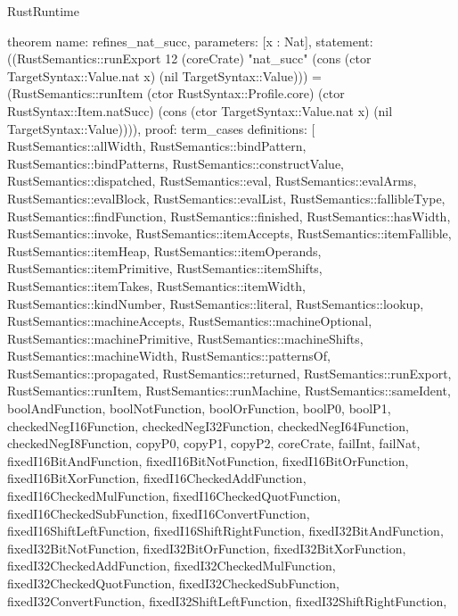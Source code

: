 \begin{lexlean}{RustRuntime}
\begin{semanticmodule}
theorem{
  name: refines_nat_succ,
  parameters: [x : Nat],
  statement: ((RustSemantics::runExport 12 (coreCrate) "nat_succ" (cons (ctor TargetSyntax::Value.nat x) (nil TargetSyntax::Value))) = (RustSemantics::runItem (ctor RustSyntax::Profile.core) (ctor RustSyntax::Item.natSucc) (cons (ctor TargetSyntax::Value.nat x) (nil TargetSyntax::Value)))),
  proof: term_cases{
    definitions: [
      RustSemantics::allWidth,
      RustSemantics::bindPattern,
      RustSemantics::bindPatterns,
      RustSemantics::constructValue,
      RustSemantics::dispatched,
      RustSemantics::eval,
      RustSemantics::evalArms,
      RustSemantics::evalBlock,
      RustSemantics::evalList,
      RustSemantics::fallibleType,
      RustSemantics::findFunction,
      RustSemantics::finished,
      RustSemantics::hasWidth,
      RustSemantics::invoke,
      RustSemantics::itemAccepts,
      RustSemantics::itemFallible,
      RustSemantics::itemHeap,
      RustSemantics::itemOperands,
      RustSemantics::itemPrimitive,
      RustSemantics::itemShifts,
      RustSemantics::itemTakes,
      RustSemantics::itemWidth,
      RustSemantics::kindNumber,
      RustSemantics::literal,
      RustSemantics::lookup,
      RustSemantics::machineAccepts,
      RustSemantics::machineOptional,
      RustSemantics::machinePrimitive,
      RustSemantics::machineShifts,
      RustSemantics::machineWidth,
      RustSemantics::patternsOf,
      RustSemantics::propagated,
      RustSemantics::returned,
      RustSemantics::runExport,
      RustSemantics::runItem,
      RustSemantics::runMachine,
      RustSemantics::sameIdent,
      boolAndFunction,
      boolNotFunction,
      boolOrFunction,
      boolP0,
      boolP1,
      checkedNegI16Function,
      checkedNegI32Function,
      checkedNegI64Function,
      checkedNegI8Function,
      copyP0,
      copyP1,
      copyP2,
      coreCrate,
      failInt,
      failNat,
      fixedI16BitAndFunction,
      fixedI16BitNotFunction,
      fixedI16BitOrFunction,
      fixedI16BitXorFunction,
      fixedI16CheckedAddFunction,
      fixedI16CheckedMulFunction,
      fixedI16CheckedQuotFunction,
      fixedI16CheckedSubFunction,
      fixedI16ConvertFunction,
      fixedI16ShiftLeftFunction,
      fixedI16ShiftRightFunction,
      fixedI32BitAndFunction,
      fixedI32BitNotFunction,
      fixedI32BitOrFunction,
      fixedI32BitXorFunction,
      fixedI32CheckedAddFunction,
      fixedI32CheckedMulFunction,
      fixedI32CheckedQuotFunction,
      fixedI32CheckedSubFunction,
      fixedI32ConvertFunction,
      fixedI32ShiftLeftFunction,
      fixedI32ShiftRightFunction,
}}
\end{semanticmodule}
\end{lexlean}
